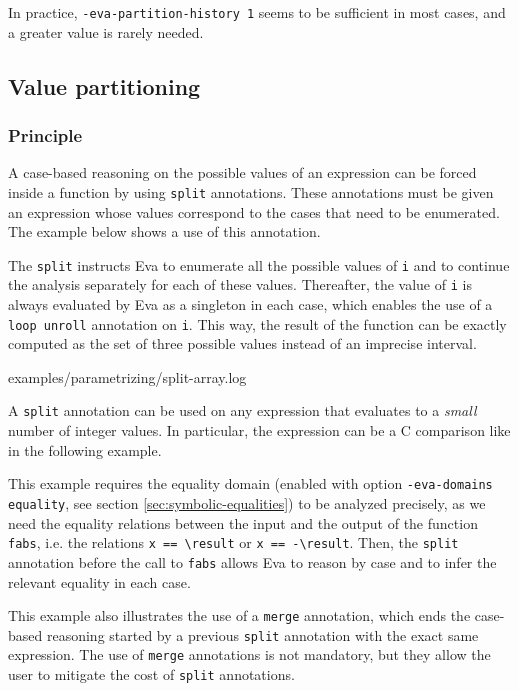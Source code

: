 \documentclass[web]{frama-c-book}
\newcommand{\Eva}{\textsf{Eva}}
\begin{document}
In practice, \lstinline|-eva-partition-history 1| seems to be sufficient in
most cases, and a greater value is rarely needed.


\subsection{Value partitioning}

\subsubsection{Principle}

A case-based reasoning on the possible values of an expression can be forced
inside a function by using \lstinline|split| annotations.  These annotations
must be given an expression whose values correspond to the cases that need to be
enumerated. The example below shows a use of this annotation.



The \lstinline|split| instructs \Eva{} to enumerate all the possible
values of \lstinline|i| and to continue the analysis separately for
each of these values. Thereafter, the value of \lstinline|i| is always
evaluated by \Eva{} as a singleton in each case, which enables the use of a
\lstinline|loop unroll| annotation on \lstinline|i|. This way, the result of
the function can be exactly computed as the set of three possible values instead
of an imprecise interval.


  {examples/parametrizing/split-array.log}

A \lstinline|split| annotation can be used on any expression that evaluates to a
{\it small} number of integer values. In particular, the expression can be a C
comparison like in the following example.



This example requires the equality domain (enabled with option
\lstinline|-eva-domains equality|, see section \ref{sec:symbolic-equalities}) to
be analyzed precisely, as we need the equality relations between the input and
the output of the function \lstinline|fabs|, i.e. the relations
\lstinline|x == \result| or \lstinline|x == -\result|.
Then, the \lstinline|split| annotation before the call to \lstinline|fabs|
allows \Eva{} to reason by case and to infer the relevant equality in each case.

This example also illustrates the use of a \lstinline|merge| annotation, which
ends the case-based reasoning started by a previous \lstinline|split| annotation
with the exact same expression.
The use of \lstinline|merge| annotations is not mandatory, but they allow the
user to mitigate the cost of \lstinline|split| annotations.
\end{document}
